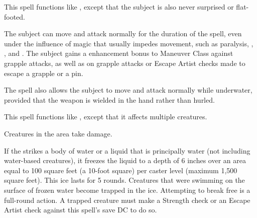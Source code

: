 \begin{spelleffect}
    This spell functions like , except that the subject is also never surprised or flat-footed.
\end{spelleffect}

\spellrng{\rngtouch}
\spelldur{\durshort}
\begin{spelleffect}
  The subject can move and attack normally for the duration of the spell, even under the influence of magic that usually impedes movement, such as paralysis, , , and . The subject gains a  enhancement bonus to Maneuver Class against grapple attacks, as well as on grapple attacks or Escape Artist checks made to escape a grapple or a pin.
  \par The spell also allows the subject to move and attack normally while underwater, provided that the weapon is wielded in the hand rather than hurled.
\end{spelleffect}

\spellrng{\rngmed}
\begin{spelleffect}
  This spell functions like , except that it affects multiple creatures.
\end{spelleffect}

\spellrng{\rngmed}
\begin{spelleffect}
  Creatures in the area take damage. 
  
  If the  strikes a body of water or a liquid that is principally water (not including water-based creatures), it freezes the liquid to a depth of 6 inches over an area equal to 100 square feet (a 10-foot square) per caster level (maximum 1,500 square feet). This ice lasts for 5 rounds. Creatures that were swimming on the surface of frozen water become trapped in the ice. Attempting to break free is a full-round action. A trapped creature must make a Strength check or an Escape Artist check against this spell's save DC to do so.
\end{spelleffect}

